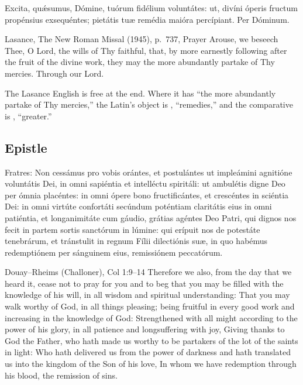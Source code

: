 
\begin{latinproper}
Excita, quǽsumus, Dómine, tuórum fidélium voluntátes: ut, divíni óperis
fructum propénsius exsequéntes; pietátis tuæ remédia maióra percípiant. Per
Dóminum.
\end{latinproper}

\begin{englishwitness}{Lasance, The New Roman Missal (1945), p.~737, Prayer}
Arouse, we beseech Thee, O Lord, the wills of Thy faithful, that, by more
earnestly following after the fruit of the divine work, they may the more
abundantly partake of Thy mercies. Through our Lord.
\end{englishwitness}

\noindent The Lasance English is free at the end. Where it has ``the more
abundantly partake of Thy mercies,'' the Latin's object is ,
``remedies,'' and the comparative is , ``greater.''

\subsection{Epistle}
\label{proper-epistle}


\begin{latinproper}
Fratres: Non cessámus pro vobis orántes, et postulántes ut impleámini
agnitióne voluntátis Dei, in omni sapiéntia et intelléctu spiritáli: ut
ambulétis digne Deo per ómnia placéntes: in omni ópere bono fructificántes,
et crescéntes in sciéntia Dei: in omni virtúte confortáti secúndum poténtiam
claritátis eius in omni patiéntia, et longanimitáte cum gáudio, grátias
agéntes Deo Patri, qui dignos nos fecit in partem sortis sanctórum in lúmine:
qui erípuit nos de potestáte tenebrárum, et tránstulit in regnum Fílii
dilectiónis suæ, in quo habémus redemptiónem per sánguinem eius, remissiónem
peccatórum.
\end{latinproper}

\begin{englishwitness}{Douay--Rheims (Challoner), Col 1:9--14}
Therefore we also, from the day that we heard it, cease not to pray for you
and to beg that you may be filled with the knowledge of his will, in all
wisdom and spiritual understanding: That you may walk worthy of God, in all
things pleasing; being fruitful in every good work and increasing in the
knowledge of God: Strengthened with all might according to the power of his
glory, in all patience and longsuffering with joy, Giving thanks to God the
Father, who hath made us worthy to be partakers of the lot of the saints in
light: Who hath delivered us from the power of darkness and hath translated us
into the kingdom of the Son of his love, In whom we have redemption through
his blood, the remission of sins.
\end{englishwitness}

